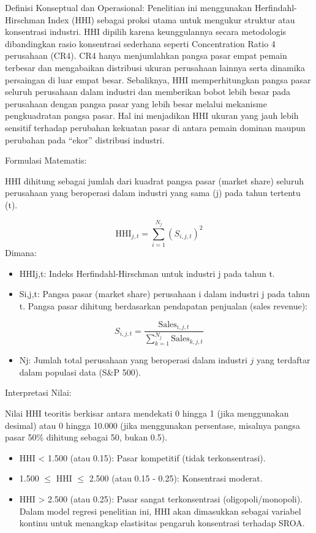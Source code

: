 \documentclass[12pt,a4paper]{report}
\providecommand{\tightlist}{%
  \setlength{\itemsep}{0pt}\setlength{\parskip}{0pt}%
}
\begin{document}
Definisi Konseptual dan Operasional: Penelitian ini menggunakan
Herfindahl-Hirschman Index (HHI) sebagai proksi utama untuk mengukur
struktur atau konsentrasi industri. HHI dipilih karena keunggulannya
secara metodologis dibandingkan rasio konsentrasi sederhana seperti
Concentration Ratio 4 perusahaan (CR4). CR4 hanya menjumlahkan pangsa
pasar empat pemain terbesar dan mengabaikan distribusi ukuran perusahaan
lainnya serta dinamika persaingan di luar empat besar. Sebaliknya, HHI
memperhitungkan pangsa pasar seluruh perusahaan dalam industri dan
memberikan bobot lebih besar pada perusahaan dengan pangsa pasar yang
lebih besar melalui mekanisme pengkuadratan pangsa pasar. Hal ini
menjadikan HHI ukuran yang jauh lebih sensitif terhadap perubahan
kekuatan pasar di antara pemain dominan maupun perubahan pada ``ekor''
distribusi industri.

Formulasi Matematis:

HHI dihitung sebagai jumlah dari kuadrat pangsa pasar (market share)
seluruh perusahaan yang beroperasi dalam industri yang sama (j) pada
tahun tertentu (t).

\[
\mathrm{HHI}_{j,t} = \sum_{i=1}^{N_j} \left(S_{i,j,t}\right)^2
\] Dimana:

\begin{itemize}
\tightlist
\item
  HHIj,t: Indeks Herfindahl-Hirschman untuk industri j pada tahun t.
\item
  Si,j,t: Pangsa pasar (market share) perusahaan i dalam industri j pada
  tahun t. Pangsa pasar dihitung berdasarkan pendapatan penjualan (sales
  revenue):
\end{itemize}

\[
S_{i,j,t} = \frac{\text{Sales}_{i,j,t}}{\sum_{k=1}^{N_j} \text{Sales}_{k,j,t}}
\]

\begin{itemize}
\tightlist
\item
  Nj: Jumlah total perusahaan yang beroperasi dalam industri \(j\) yang
  terdaftar dalam populasi data (S\&P 500).
\end{itemize}

Interpretasi Nilai:

Nilai HHI teoritis berkisar antara mendekati 0 hingga 1 (jika
menggunakan desimal) atau 0 hingga 10.000 (jika menggunakan persentase,
misalnya pangsa pasar 50\% dihitung sebagai 50, bukan 0.5).

\begin{itemize}
\tightlist
\item
  HHI \textless{} 1.500 (atau 0.15): Pasar kompetitif (tidak
  terkonsentrasi).
\item
  1.500 \(\leq\) HHI \(\leq\) 2.500 (atau 0.15 - 0.25): Konsentrasi
  moderat.
\item
  HHI \textgreater{} 2.500 (atau 0.25): Pasar sangat terkonsentrasi
  (oligopoli/monopoli). Dalam model regresi penelitian ini, HHI akan
  dimasukkan sebagai variabel kontinu untuk menangkap elastisitas
  pengaruh konsentrasi terhadap SROA.
\end{itemize}
\end{document}
